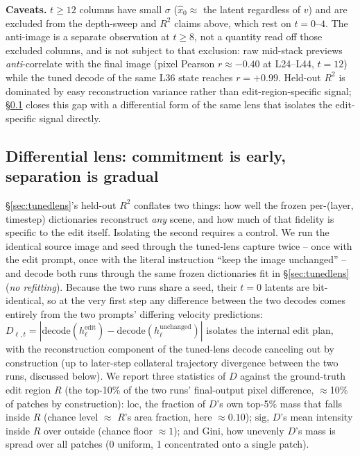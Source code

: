 \documentclass[10pt,twocolumn]{article}
\begin{document}
\textbf{Caveats.} $t{\ge}12$ columns have small $\sigma$ ($\hat x_0
\approx$ the latent regardless of $v$) and are excluded from the
depth-sweep and $R^2$ claims above, which rest on $t{=}0$--$4$. The
anti-image is a separate observation at $t{\ge}8$, not a quantity
read off those excluded columns, and is not subject to that
exclusion: raw mid-stack previews
\emph{anti}-correlate with the final image (pixel Pearson
$r\approx-0.40$ at L24--L44, $t{=}12$) while the tuned decode of the
same L36 state reaches $r=+0.99$. Held-out $R^2$ is dominated by easy
reconstruction variance rather than edit-region-specific signal;
\S\ref{sec:difflens} closes this gap with a differential form of the
same lens that isolates the edit-specific signal directly.

\subsection{Differential lens: commitment is early, separation is
gradual}\label{sec:difflens}

\S\ref{sec:tunedlens}'s held-out $R^2$ conflates two things: how well
the frozen per-(layer, timestep) dictionaries reconstruct \emph{any}
scene, and how much of that fidelity is specific to the edit itself.
Isolating the second requires a control. We run the identical source
image and seed through the tuned-lens capture twice -- once with the
edit prompt, once with the literal instruction ``keep the image
unchanged'' -- and decode both runs through the same frozen
dictionaries fit in \S\ref{sec:tunedlens} (\emph{no refitting}).
Because the two runs share a seed, their $t{=}0$ latents are
bit-identical, so at the very first step any difference between the
two decodes comes entirely from the two prompts' differing velocity
predictions: $D_{\ell,t} = |\text{decode}(h_\ell^{\text{edit}}) -
\text{decode}(h_\ell^{\text{unchanged}})|$ isolates the internal edit
plan, with the reconstruction component of the tuned-lens decode
canceling out by construction (up to later-step collateral trajectory
divergence between the two runs, discussed below). We report three
statistics of $D$ against the ground-truth edit region $R$ (the
top-10\% of the two runs' final-output pixel difference,
$\approx$10\% of patches by construction): $\mathrm{loc}$, the fraction
of $D$'s own top-5\% mass that falls inside $R$ (chance level
$\approx$ $R$'s area fraction, here $\approx0.10$); $\mathrm{sig}$,
$D$'s mean intensity inside $R$ over outside (chance floor
$\approx1$); and Gini, how unevenly $D$'s mass is spread over all
patches (0 uniform, 1 concentrated onto a single patch).
\end{document}
